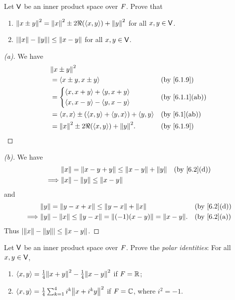 \begin{ex}\label{ex:6.1.19}
	Let \(\mathsf{V}\) be an inner product space over \(\mathit{F}\).
	Prove that
	\begin{enumerate}
		\item \(\left\lVert x \pm y\right\rVert^2 = \left\lVert x\right\rVert^2 \pm 2 \Re(\left\langle x, y\right\rangle) + \left\lVert y\right\rVert^2\) for all \(x, y \in \mathsf{V}\).
		\item \(\left\lvert\left\lVert x\right\rVert - \left\lVert y\right\rVert\right\rvert \leq \left\lVert x - y\right\rVert\) for all \(x, y \in \mathsf{V}\).
	\end{enumerate}
\end{ex}

\begin{proof}[(a)]
	We have
	\begin{align*}
		 & \norm{x \pm y}^2                                                          \\
		 & = \inn{x \pm y, x \pm y}                                &  & \by{6.1.9}   \\
		 & = \begin{dcases}
			     \inn{x, x + y} + \inn{y, x + y} \\
			     \inn{x, x - y} - \inn{y, x - y}
		     \end{dcases}                      &  & \by{6.1.1}[ab]                   \\
		 & = \inn{x, x} \pm (\inn{x, y} + \inn{y, x}) + \inn{y, y} &  & \by{6.1}[ab] \\
		 & = \norm{x}^2 \pm 2 \Re(\inn{x, y}) + \norm{y}^2.        &  & \by{6.1.9}
	\end{align*}
\end{proof}

\begin{proof}[(b)]
	We have
	\begin{align*}
		         & \norm{x} = \norm{x - y + y} \leq \norm{x - y} + \norm{y} &  & \by{6.2}[d] \\
		\implies & \norm{x} - \norm{y} \leq \norm{x - y}
	\end{align*}
	and
	\begin{align*}
		         & \norm{y} = \norm{y - x + x} \leq \norm{y - x} + \norm{x}                   &  & \by{6.2}[d] \\
		\implies & \norm{y} - \norm{x} \leq \norm{y - x} = \norm{(-1)(x - y)} = \norm{x - y}. &  & \by{6.2}[a]
	\end{align*}
	Thus \(\left\lvert\left\lVert x\right\rVert - \left\lVert y\right\rVert\right\rvert \leq \left\lVert x - y\right\rVert\).
\end{proof}

\begin{ex}\label{ex:6.1.20}
	Let \(\mathsf{V}\) be an inner product space over \(\mathit{F}\).
	Prove the \emph{polar identities}:
	For all \(x, y \in \mathsf{V}\),
	\begin{enumerate}
		\item \(\inn{x, y} = \frac{1}{4} \norm{x + y}^2 - \frac{1}{4} \norm{x - y}^2\) if \(\mathit{F} = \mathbb{R}\);
		\item \(\inn{x, y} = \frac{1}{4} \sum_{k = 1}^4 i^k \norm{x + i^k y}^2\) if \(\mathit{F} = \mathbb{C}\), where \(i^2 = -1\).
	\end{enumerate}
\end{ex}

